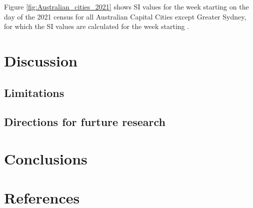 \documentclass[preprint, 3p,
authoryear]{elsarticle} %
\begin{document}
Figure \ref{fig:Australian_cities_2021} shows SI values for the week
starting on the day of the 2021 census for all Australian Capital Cities
except Greater Sydney, for which the SI values are calculated for the
week starting .

\section{Discussion}\label{discussion}

\subsection{Limitations}\label{limitations}

\subsection{Directions for furture
research}\label{directions-for-furture-research}

\section{Conclusions}\label{conclusions}

\section*{References}\label{references}

\renewcommand\refname{Appendix A - GCCSA maps by SA1}

\end{document}
